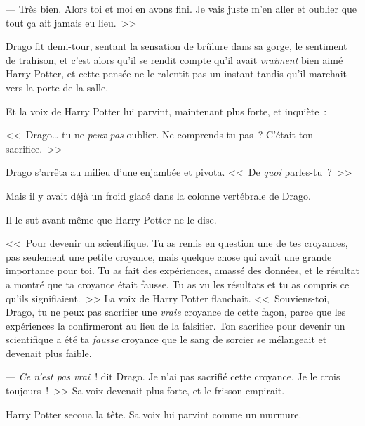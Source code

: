 --- Très bien. Alors toi et moi en avons fini. Je vais juste m'en aller et oublier que tout ça ait jamais eu lieu.~>>

Drago fit demi-tour, sentant la sensation de brûlure dans sa gorge, le sentiment de trahison, et c'est alors qu'il se rendit compte qu'il avait \emph{vraiment} bien aimé Harry Potter, et cette pensée ne le ralentit pas un instant tandis qu'il marchait vers la porte de la salle.

Et la voix de Harry Potter lui parvint, maintenant plus forte, et inquiète~:

<<~Drago… tu ne \emph{peux pas} oublier. Ne comprends-tu pas~? C'était ton sacrifice.~>>

Drago s'arrêta au milieu d'une enjambée et pivota. <<~De \emph{quoi} parles-tu~?~>>

Mais il y avait déjà un froid glacé dans la colonne vertébrale de Drago.

Il le sut avant même que Harry Potter ne le dise.

<<~Pour devenir un scientifique. Tu as remis en question une de tes croyances, pas seulement une petite croyance, mais quelque chose qui avait une grande importance pour toi. Tu as fait des expériences, amassé des données, et le résultat a montré que ta croyance était fausse. Tu as vu les résultats et tu as compris ce qu'ils signifiaient.~>> La voix de Harry Potter flanchait. <<~Souviens-toi, Drago, tu ne peux pas sacrifier une \emph{vraie} croyance de cette façon, parce que les expériences la confirmeront au lieu de la falsifier. Ton sacrifice pour devenir un scientifique a été ta \emph{fausse} croyance que le sang de sorcier se mélangeait et devenait plus faible.

--- \emph{Ce n'est pas vrai}~! dit Drago. Je n'ai pas sacrifié cette croyance. Je le crois toujours~!~>> Sa voix devenait plus forte, et le frisson empirait.

Harry Potter secoua la tête. Sa voix lui parvint comme un murmure.

